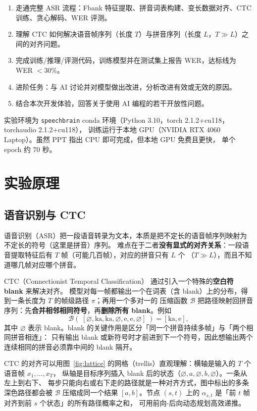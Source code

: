 \documentclass[a4paper]{article}
\begin{document}
\begin{enumerate}
  \item 走通完整 ASR 流程：Fbank 特征提取、拼音词表构建、变长数据对齐、CTC 训练、贪心解码、WER 评测。
  \item 理解 CTC 如何解决语音帧序列（长度 $T$）与拼音序列（长度 $L$，$T\gg L$）之间的对齐问题。
  \item 完成训练/推理/评测代码，训练模型并在测试集上报告 WER，达标线为 WER $<30\%$。
  \item 进阶任务：与 AI 讨论并对模型做出改进，分析改进有效或无效的原因。
  \item 结合本次开发体验，回答关于使用 AI 编程的若干开放性问题。
\end{enumerate}

实验环境为 \texttt{speechbrain} conda 环境（Python 3.10，torch 2.1.2+cu118，torchaudio 2.1.2+cu118），
训练运行于本地 GPU（NVIDIA RTX 4060 Laptop）。虽然 PPT 指出 CPU 即可完成，但本地 GPU 免费且更快，
单个 epoch 约 70 秒。

\section{实验原理}
\subsection{语音识别与 CTC}
语音识别（ASR）把一段语音转录为文本，本质是把不定长的语音帧序列映射为不定长的符号（这里是拼音）序列。
难点在于二者\textbf{没有显式的对齐关系}：一段语音提取特征后有 $T$ 帧（可能几百帧），对应的拼音只有 $L$ 个
（$T\gg L$），而且不知道哪几帧对应哪个拼音。

CTC（Connectionist Temporal Classification）\cite{ctc} 通过引入一个特殊的\textbf{空白符 blank} 来解决对齐。
模型对每一帧都输出一个在词表（含 blank）上的分布，得到一条长度为 $T$ 的帧级路径 $\pi$；再用一个多对一的
压缩函数 $\mathcal{B}$ 把路径映射回拼音序列：先\textbf{合并相邻相同符号}，再\textbf{删除所有 blank}。例如
\begin{equation}
  \mathcal{B}(\;[\varnothing,\text{ka},\text{ka},\varnothing,\text{e},\text{e},\varnothing]\;)=[\text{ka},\text{e}],
\end{equation}
其中 $\varnothing$ 表示 blank。blank 的关键作用是区分「同一个拼音持续多帧」与「两个相同拼音相连」：
只有输出 blank 或新符号时才前进到下一个符号，因此想输出两个连续相同的拼音必须靠中间的 blank 隔开。

CTC 的对齐可以用图~\ref{fig:lattice} 的网格（trellis）直观理解：横轴是输入的 $T$ 个语音帧 $x_1,\dots,x_T$，
纵轴是目标序列插入 blank 后的状态（$\varnothing,a,\varnothing,b,\varnothing$）。一条从左上到右下、
每步只能向右或右下走的路径就是一种对齐方式，图中标出的多条深色路径都会被 $\mathcal{B}$ 压缩成同一个结果
$[a,b]$。节点 $(s,t)$ 上的 $\alpha_{s,t}$ 是「前 $t$ 帧对齐到前 $s$ 个状态」的所有路径概率之和，
可用前向-后向动态规划高效递推。
\end{document}
